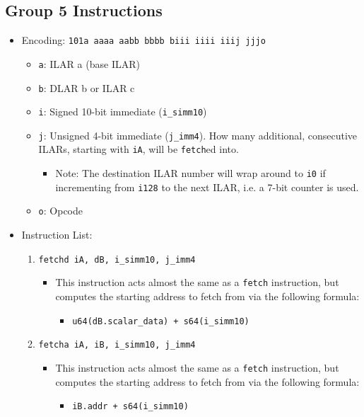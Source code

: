 \documentclass{article}
\begin{document}
	\subsection{Group 5 Instructions}
		\begin{itemize}
		\item Encoding:  \texttt{101a aaaa aabb bbbb  biii iiii iiij jjjo}
			\begin{itemize}
			\item \texttt{a}:  ILAR a (base ILAR)
			\item \texttt{b}:  DLAR b or ILAR c
			\item \texttt{i}:  Signed 10-bit immediate (\texttt{i\_simm10})
			\item \texttt{j}:  Unsigned 4-bit immediate (\texttt{j\_imm4}).
				How many additional, consecutive ILARs, starting with
				\texttt{iA}, will be \texttt{fetch}ed into.
				\begin{itemize}
				\item Note:  The destination ILAR number will wrap around
					to \texttt{i0} if incrementing from \texttt{i128} to
					the next ILAR, i.e. a 7-bit counter is used.
				\end{itemize}
			\item \texttt{o}:  Opcode
			\end{itemize}
		\item Instruction List:
			\begin{enumerate}
			\item \texttt{fetchd iA, dB, i\_simm10, j\_imm4}
				\begin{itemize}
				\item This instruction acts almost the same as a
					\texttt{fetch} instruction, but computes the starting
					address to fetch from via the following formula:
					\begin{itemize}
					\item \texttt{u64(dB.scalar\_data) + s64(i\_simm10)}
					\end{itemize}
				\end{itemize}
			\item \texttt{fetcha iA, iB, i\_simm10, j\_imm4}
				\begin{itemize}
				\item This instruction acts almost the same as a
					\texttt{fetch} instruction, but computes the starting
					address to fetch from via the following formula:
					\begin{itemize}
					\item \texttt{iB.addr + s64(i\_simm10)}
					\end{itemize}
				\end{itemize}
			\end{enumerate}
		\end{itemize}
\end{document}
